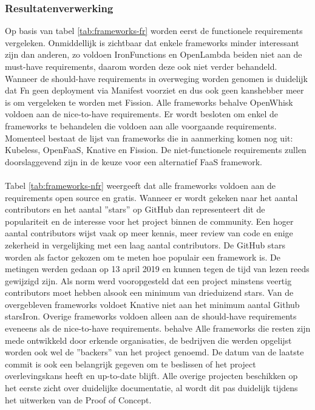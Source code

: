 \subsubsection{Resultatenverwerking}
Op basis van tabel \ref{tab:frameworks-fr} worden eerst de functionele requirements vergeleken. Onmiddellijk is zichtbaar dat enkele frameworks minder interessant zijn dan anderen, zo voldoen IronFunctions en OpenLambda beiden niet aan de must-have requirements, daarom worden deze ook niet verder behandeld. Wanneer de should-have requirements in overweging worden genomen is duidelijk dat Fn geen deployment via Manifest voorziet en dus ook geen kanshebber meer is om vergeleken te worden met Fission. Alle frameworks behalve OpenWhisk voldoen aan de nice-to-have requirements. Er wordt besloten om enkel de frameworks te behandelen die voldoen aan alle voorgaande requirements. Momenteel bestaat de lijst van frameworks die in aanmerking komen nog uit: Kubeless, OpenFaaS, Knative en Fission. De niet-functionele requirements zullen doorslaggevend zijn in de keuze voor een alternatief FaaS framework.
\\\\
Tabel \ref{tab:frameworks-nfr} weergeeft dat alle frameworks voldoen aan de requirements open source en gratis. Wanneer er wordt gekeken naar het aantal contributors en het aantal ''stars'' op GitHub dan representeert dit de populariteit en de interesse voor het project binnen de community. Een hoger aantal contributors wijst vaak op meer kennis, meer review van code en enige zekerheid in vergelijking met een laag aantal contributors. De GitHub stars worden als factor gekozen om te meten hoe populair een framework is. De metingen werden gedaan op 13 april 2019 en kunnen tegen de tijd van lezen reeds gewijzigd zijn. Als norm werd vooropgesteld dat een project minstens veertig contributors moet hebben alsook een minimum van drieduizend stars. Van de overgebleven frameworks voldoet Knative niet aan het minimum aantal Github starsIron. Overige frameworks voldoen alleen aan de should-have requirements eveneens als de nice-to-have requirements. behalve  Alle frameworks die resten zijn mede ontwikkeld door erkende organisaties, de bedrijven die werden opgelijst worden ook wel de ''backers'' van het project genoemd. De datum van de laatste commit is ook een belangrijk gegeven om te beslissen of het project overlevingskans heeft en up-to-date blijft. Alle overige projecten beschikken op het eerste zicht over duidelijke documentatie, al wordt dit pas duidelijk tijdens het uitwerken van de Proof of Concept. 


